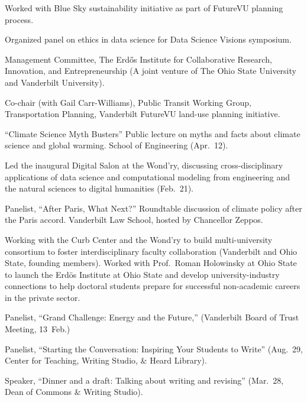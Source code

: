 \item[2018--2019] Worked with Blue Sky sustainability initiative as part of FutureVU planning process.
\item[2018] Organized panel on ethics in data science for Data Science Visions symposium.
\item[2017--present] Management Committee, The Erd\H{o}s Institute for Collaborative Research, Innovation, and Entrepreneurship (A joint venture of The Ohio State University and Vanderbilt University).
\item[2017] Co-chair (with Gail Carr-Williams), Public Transit Working Group, Transportation Planning, Vanderbilt FutureVU land-use planning initiative.
\item[2017] ``Climate Science Myth Busters'' Public lecture on myths and facts about climate science and global warming. School of Engineering (Apr.~12).
\item[2017] Led the inaugural Digital Salon at the Wond'ry, discussing cross-disciplinary applications of data science and computational modeling from engineering and the natural sciences to digital humanities (Feb.~21).
\item[2016] Panelist, ``After Paris, What Next?''  Roundtable discussion of climate policy after the Paris accord. Vanderbilt Law School, hosted by Chancellor Zeppos.
\item[2015--2017] Working with the Curb Center and the Wond'ry to build multi-university consortium to foster interdisciplinary faculty collaboration (Vanderbilt and Ohio State, founding members).  Worked with Prof.\ Roman Holowinsky at Ohio State to launch the Erd\"os Institute at Ohio State and develop university-industry connections to help doctoral students prepare for successful non-academic careers in the private sector.
\item[2015] Panelist, ``Grand Challenge: Energy and the Future,'' (Vanderbilt Board of Trust Meeting, 13~Feb.)
\item[2013] Panelist, ``Starting the Conversation: Inspiring Your Students to Write'' (Aug.~29, Center for Teaching, Writing Studio, \& Heard Library).
\item[2013] Speaker, ``Dinner and a draft: Talking about writing and revising'' (Mar.~28, Dean of Commons \& Writing Studio).
